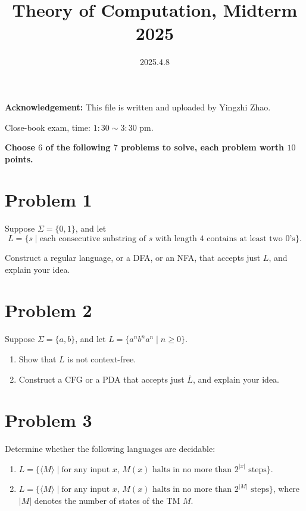 \documentclass[12pt]{article}
\title{\textbf{Theory of Computation, Midterm 2025}}
\date{2025.4.8}
\begin{document}
\maketitle

\textbf{Acknowledgement:} This file is written and uploaded by Yingzhi Zhao.

Close-book exam, time: $1:30\sim 3:30$ pm.

\textbf{Choose $6$ of the following $7$ problems to solve, each problem worth $10$ points.}

\section*{Problem 1}

Suppose $\Sigma=\{0,1\}$, and let 
$$L=\{s\mid \text{each consecutive substring of } s \text{ with length } 4 \text{ contains at least two 0's}\}.$$

Construct a regular language, or a DFA, or an NFA, that accepts just $L$, and explain your idea.

\section*{Problem 2}

Suppose $\Sigma=\{a,b\}$, and let $L=\{a^nb^na^n\mid n\ge 0\}$.

\begin{enumerate}
	\item Show that $L$ is not context-free.
	\item Construct a CFG or a PDA that accepts just $\overline{L}$, and explain your idea.
\end{enumerate}

\section*{Problem 3}

Determine whether the following languages are decidable:

\begin{enumerate}
	\item $L=\{\langle M\rangle \mid \text{for any input } x \text{, } M(x) \text{ halts in no more than } 2^{\lvert x\rvert} \text{ steps}\}$.
	\item $L=\{\langle M\rangle \mid \text{for any input } x \text{, } M(x) \text{ halts in no more than } 2^{\lvert M\rvert} \text{ steps}\}$, where $\lvert M\rvert$ denotes the number of states of the TM $M$.
\end{enumerate}
\end{document}
